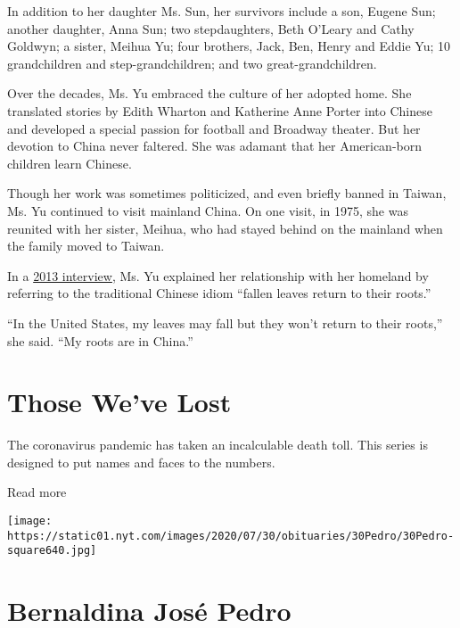 In addition to her daughter Ms. Sun, her survivors include a son, Eugene
Sun; another daughter, Anna Sun; two stepdaughters, Beth O'Leary and
Cathy Goldwyn; a sister, Meihua Yu; four brothers, Jack, Ben, Henry and
Eddie Yu; 10 grandchildren and step-grandchildren; and two
great-grandchildren.

Over the decades, Ms. Yu embraced the culture of her adopted home. She
translated stories by Edith Wharton and Katherine Anne Porter into
Chinese and developed a special passion for football and Broadway
theater. But her devotion to China never faltered. She was adamant that
her American-born children learn Chinese.

Though her work was sometimes politicized, and even briefly banned in
Taiwan, Ms. Yu continued to visit mainland China. On one visit, in 1975,
she was reunited with her sister, Meihua, who had stayed behind on the
mainland when the family moved to Taiwan.

In a
\href{https://xw.qq.com/partner/standard/20200503A0LZLN/20200503A0LZLN00?ADTAG=standard\&pgv_ref=standard}{2013
interview}, Ms. Yu explained her relationship with her homeland by
referring to the traditional Chinese idiom ``fallen leaves return to
their roots.''

``In the United States, my leaves may fall but they won't return to
their roots,'' she said. ``My roots are in China.''

\href{https://www.nytimes.com/interactive/2020/obituaries/people-died-coronavirus-obituaries.html?action=click\&pgtype=Article\&state=default\&region=BELOW_MAIN_CONTENT\&context=covid_obits_promo}{}

\hypertarget{those-weve-lost}{%
\section{Those We've Lost}\label{those-weve-lost}}

The coronavirus pandemic has taken an incalculable death toll. This
series is designed to put names and faces to the numbers.

Read more

\texttt{[image: https://static01.nyt.com/images/2020/07/30/obituaries/30Pedro/30Pedro-square640.jpg]}

\hypertarget{bernaldina-josuxe9-pedro}{%
\section{Bernaldina José Pedro}\label{bernaldina-josuxe9-pedro}}


